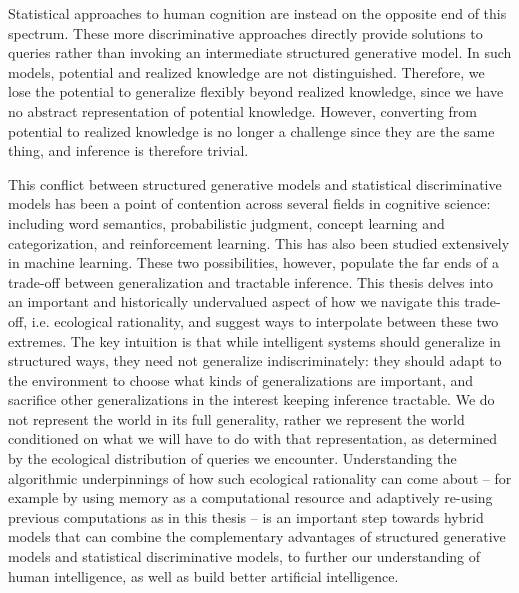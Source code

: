 Statistical approaches to human cognition are instead on the opposite end of this spectrum. These more discriminative approaches directly provide solutions to queries rather than invoking an intermediate structured generative model. In such models, potential and realized knowledge are not distinguished. Therefore, we lose the potential to generalize flexibly beyond realized knowledge, since we have no abstract representation of potential knowledge. However, converting from potential to realized knowledge is no longer a challenge since they are the same thing, and inference is therefore trivial.

This conflict between structured generative models and statistical discriminative models has been a point of contention across several fields in cognitive science: including word semantics\cite{steyvers2007probabilistic, rogers2004semantic, gleitman1990structural}, probabilistic judgment\citep{oaksford2007bayesian, tversky1974judgment}, concept learning and categorization\citep{bruner2017study, medin1978context, shepard1987toward}, and reinforcement learning\citep{gershman2014retrospective, daw2011model, kool2017cost}. This has also been studied extensively in machine learning\citep{ng2002discriminative, lake2017building}. These two possibilities, however, populate the far ends of a trade-off between generalization and tractable inference. This thesis delves into an important and historically undervalued aspect of how we navigate this trade-off, i.e. ecological rationality, and suggest ways to interpolate between these two extremes. The key intuition is that while intelligent systems should generalize in structured ways, they need not generalize indiscriminately: they should adapt to the environment to choose what kinds of generalizations are important, and sacrifice other generalizations in the interest keeping inference tractable. We do not represent the world in its full generality, rather we represent the world conditioned on what we will have to do with that representation, as determined by the ecological distribution of queries we encounter. Understanding the algorithmic underpinnings of how such ecological rationality can come about -- for example by using memory as a computational resource and adaptively re-using previous computations as in this thesis -- is an important step towards hybrid models that can combine the complementary advantages of structured generative models and statistical discriminative models, to further our understanding of human intelligence, as well as build better artificial intelligence.




